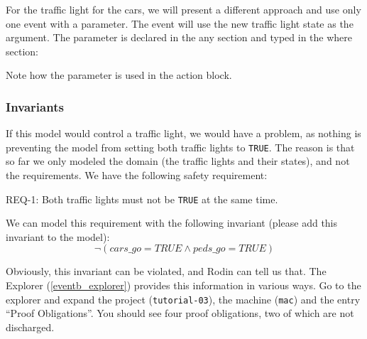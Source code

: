 For the traffic light for the cars, we will present a different approach and use only one event with a parameter.  The event will use the new traffic light state as the argument.  The parameter is declared in the \textsf{any} section and typed in the \textsf{where} section:


Note how the parameter is used in the action block.

\subsubsection{Invariants}
\label{tutorial:invariants}

If this model would control a traffic light, we would have a problem, as nothing is preventing the model from setting both traffic lights to \texttt{TRUE}.  The reason is that so far we only modeled the domain (the traffic lights and their states), and not the requirements.  We have the following safety requirement:

\begin{center}REQ-1: Both traffic lights must not be \texttt{TRUE} at the same time.\end{center}

We can model this requirement with the following invariant (please add this invariant to the model):
\[
\lnot  (cars\_go = TRUE \land  peds\_go = TRUE)
\]

Obviously, this invariant can be violated, and Rodin can tell us that.  The Explorer (\ref{eventb_explorer}) provides this information in various ways.  Go to the explorer and expand the project (\texttt{tutorial-03}), the machine (\texttt{mac}) and the entry ``Proof Obligations''.  You should see four proof obligations, two of which are not discharged.

